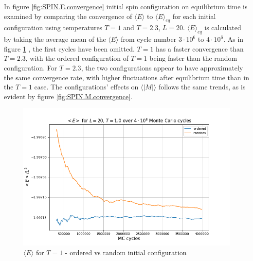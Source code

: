 \documentclass[%
oneside,                 %
final,                   %
10pt]{article}
\begin{document}
In figure \ref{fig:SPIN.E.convergence} initial spin configuration on equilibrium time is examined by comparing the convergence of $\langle E \rangle$ to $\langle E \rangle_{eq}$ for each initial configuration using temperatures $T=1$ and $T=2.3$, $L=20$.  $\langle E \rangle_{eq}$ is calculated by taking the average mean of the $\langle E \rangle$ from cycle number $3\cdot 10^6$ to $4\cdot 10^6$.  As in figure \ref{fig:L20T1E} , the first cycles have been omitted. $T=1$ has a faster convergence than $T=2.3$, with the ordered configuration of $T=1$ being faster than the random configuration. For $T=2.3$, the two configurations appear to have approximately the same convergence rate, with higher fluctuations after equilibrium time than in the $T=1$ case. The configurations' effects on $\langle |M| \rangle$ follows the same trends, as is evident by figure \ref{fig:SPIN.M.convergence}. \newline



\begin{figure}[!htb]
        \centering 
         \includegraphics[scale=.55]{../Results/L20T1_eq_E.png} 
        \caption{$\langle E \rangle$ for $T=1$ - ordered vs random initial configuration}
        \label{fig:L20T1E}   
\end{figure} 
\end{document}
